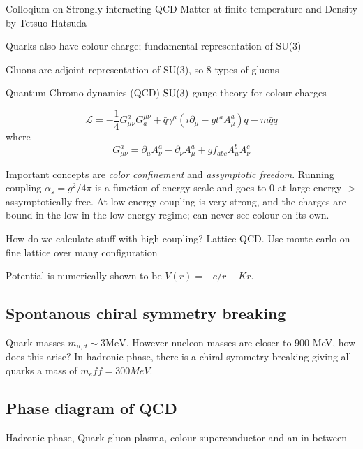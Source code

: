 \documentclass[a4paper]{article}
\author{Oscar Emil Sommer}
\begin{document}
Colloqium on Strongly interacting QCD Matter at finite temperature and Density
by Tetsuo Hatsuda


Quarks also have colour charge; fundamental representation of SU(3)


Gluons are adjoint representation of SU(3), so 8 types of gluons



Quantum Chromo dynamics (QCD)
$\mathrm{SU}(3)$ gauge theory for colour charges

\[ \mathcal{L}=-\frac{1}{4} G_{\mu \nu}^a G_a^{\mu \nu} +\bar{q}\gamma^\mu
(i\partial_\mu -gt^aA^a_\mu)q - m\bar{q}q\]
where 
\[ G_{\mu\nu}^a=\partial_\mu A^a_\nu -\partial_\nu A_\mu ^a +g f_{abc} A^b_\mu
A^c_\nu\]

Important concepts are \emph{color confinement} and \emph{assymptotic freedom}.
Running coupling $\alpha_s=g^2/4\pi$ is a function of energy scale and goes to
0 at large energy -> assymptotically free. At low energy coupling is very
strong, and the charges are bound in the low in the low energy regime; can
never see colour on its own.

How do we calculate stuff with high coupling? Lattice QCD.
Use monte-carlo on fine lattice over many configuration

Potential is numerically shown to be $V(r)=-c/r +Kr$.


\subsection{Spontanous chiral symmetry breaking}
Quark masses $m_{u,d}\sim 3\text{MeV}$. However nucleon masses are closer to
900 MeV, how does this arise? In hadronic phase, there is a chiral symmetry
breaking giving all quarks a mass of $m_eff =300MeV$.

\subsection{Phase diagram of QCD}

Hadronic phase, Quark-gluon plasma, colour superconductor and an in-between 
\end{document}
